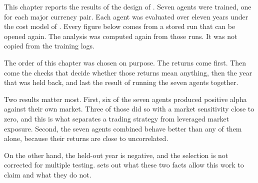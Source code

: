 \label{Chapter:ExperimentalResults}

This chapter reports the results of the design of . Seven agents were trained, one for each major currency pair. Each agent was evaluated over eleven years under the cost model of . Every figure below comes from a stored run that can be opened again. The analysis was computed again from those runs. It was not copied from the training logs.

The order of this chapter was chosen on purpose. The returns come first. Then come the checks that decide whether those returns mean anything, then the year that was held back, and last the result of running the seven agents together.





















Two results matter most. First, six of the seven agents produced positive alpha against their own market. Three of those did so with a market sensitivity close to zero, and this is what separates a trading strategy from leveraged market exposure. Second, the seven agents combined behave better than any of them alone, because their returns are close to uncorrelated.

On the other hand, the held-out year is negative, and the selection is not corrected for multiple testing.  sets out what these two facts allow this work to claim and what they do not.